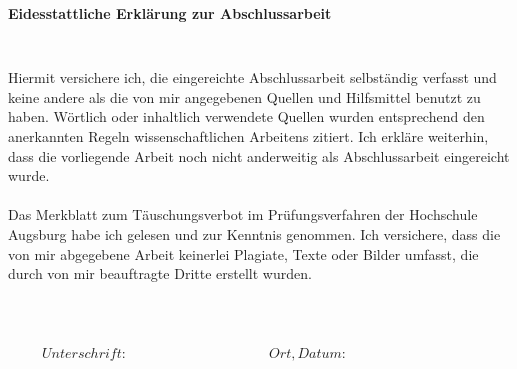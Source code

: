 \newpage

\thispagestyle{empty}

\begin{verbatim}

\end{verbatim}

\begin{LARGE}
\begin{center}
	\textbf{Eidesstattliche Erklärung zur Abschlussarbeit}
\end{center}
\end{LARGE}
\begin{verbatim}


\end{verbatim}
Hiermit versichere ich, die eingereichte Abschlussarbeit selbständig verfasst und
keine andere als die von mir angegebenen Quellen und Hilfsmittel benutzt zu haben.
Wörtlich oder inhaltlich verwendete Quellen wurden entsprechend den anerkannten
Regeln wissenschaftlichen Arbeitens zitiert. Ich erkläre weiterhin, dass die
vorliegende Arbeit noch nicht anderweitig als Abschlussarbeit eingereicht wurde.
\\
\\
Das Merkblatt zum Täuschungsverbot im Prüfungsverfahren der Hochschule
Augsburg habe ich gelesen und zur Kenntnis genommen. Ich versichere, dass die
von mir abgegebene Arbeit keinerlei Plagiate, Texte oder Bilder umfasst, die durch
von mir beauftragte Dritte erstellt wurden.
\begin{verbatim}



\end{verbatim}


\begin{displaymath}
\begin{array}{ll}
Unterschrift:~~~~~~~~~~~~~~~~~~~~~~~~~~~~~~~~~~~~~~~~~~
& Ort, Datum:~~~~~~~~~~~~~~~~~~~~~~~~~~~~~~~~~~~~~~~~~~
\end{array}
\end{displaymath}